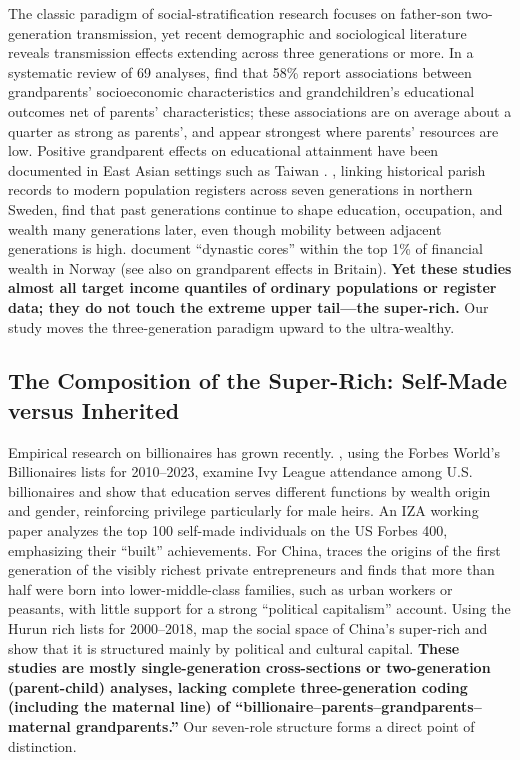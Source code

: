 \documentclass[11pt,a4paper]{article}
\begin{document}
The classic paradigm of social-stratification research focuses on father-son two-generation transmission, yet recent demographic and sociological literature reveals transmission effects extending across three generations or more. In a systematic review of 69 analyses, \citet{anderson2018} find that 58\% report associations between grandparents' socioeconomic characteristics and grandchildren's educational outcomes net of parents' characteristics; these associations are on average about a quarter as strong as parents', and appear strongest where parents' resources are low. Positive grandparent effects on educational attainment have been documented in East Asian settings such as Taiwan \citep{chiang2015}. \citet{hallsten2023}, linking historical parish records to modern population registers across seven generations in northern Sweden, find that past generations continue to shape education, occupation, and wealth many generations later, even though mobility between adjacent generations is high. \citet{toft2022} document ``dynastic cores'' within the top 1\% of financial wealth in Norway (see also \citet{chan2013} on grandparent effects in Britain). \textbf{Yet these studies almost all target income quantiles of ordinary populations or register data; they do not touch the extreme upper tail---the super-rich.} Our study moves the three-generation paradigm upward to the ultra-wealthy.

\subsection{The Composition of the Super-Rich: Self-Made versus Inherited}

Empirical research on billionaires has grown recently. \citet{lillie2025}, using the Forbes World's Billionaires lists for 2010--2023, examine Ivy League attendance among U.S. billionaires and show that education serves different functions by wealth origin and gender, reinforcing privilege particularly for male heirs. An IZA working paper \citep{iza2026} analyzes the top 100 self-made individuals on the US Forbes 400, emphasizing their ``built'' achievements. For China, \citet{lu2017} traces the origins of the first generation of the visibly richest private entrepreneurs and finds that more than half were born into lower-middle-class families, such as urban workers or peasants, with little support for a strong ``political capitalism'' account. Using the Hurun rich lists for 2000--2018, \citet{lu2021} map the social space of China's super-rich and show that it is structured mainly by political and cultural capital. \textbf{These studies are mostly single-generation cross-sections or two-generation (parent-child) analyses, lacking complete three-generation coding (including the maternal line) of ``billionaire--parents--grandparents--maternal grandparents.''} Our seven-role structure forms a direct point of distinction.
\end{document}
